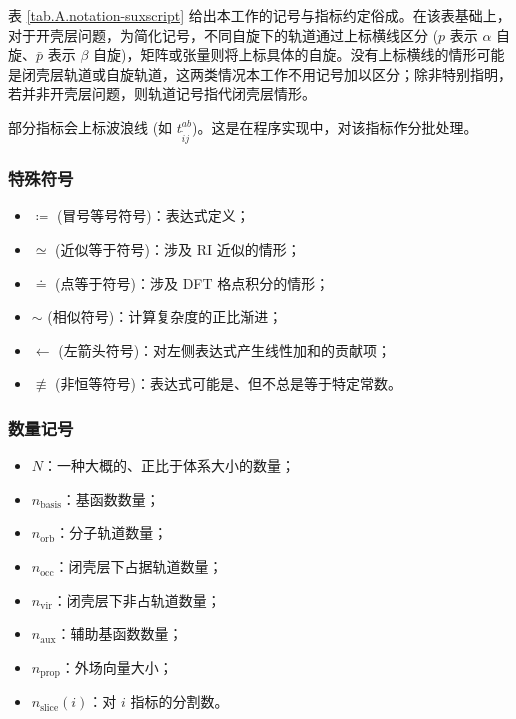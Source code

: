 表 \ref{tab.A.notation-suxscript} 给出本工作的记号与指标约定俗成。在该表基础上，对于开壳层问题，为简化记号，不同自旋下的轨道通过上标横线区分 ($p$ 表示 $\alpha$ 自旋、$\bar p$ 表示 $\beta$ 自旋)，矩阵或张量则将上标具体的自旋。没有上标横线的情形可能是闭壳层轨道或自旋轨道，这两类情况本工作不用记号加以区分；除非特别指明，若并非开壳层问题，则轨道记号指代闭壳层情形。

部分指标会上标波浪线 (如 $t_{\tilde{i} j}^{ab}$)。这是在程序实现中，对该指标作分批处理。

\subsubsection{特殊符号}

\begin{itemize}[nosep]
    \item $\coloneq$ (冒号等号符号)：表达式定义；
    \item $\simeq$ (近似等于符号)：涉及 RI 近似的情形；
    \item $\doteq$ (点等于符号)：涉及 DFT 格点积分的情形；
    \item $\sim$ (相似符号)：计算复杂度的正比渐进；
    \item $\leftarrow$ (左箭头符号)：对左侧表达式产生线性加和的贡献项；
    \item $\not \equiv$ (非恒等符号)：表达式可能是、但不总是等于特定常数。
\end{itemize}

\subsubsection{数量记号}

\begin{itemize}[nosep]
    \item $N$：一种大概的、正比于体系大小的数量；
    \item $n_\mathrm{basis}$：基函数数量；
    \item $n_\mathrm{orb}$：分子轨道数量；
    \item $n_\mathrm{occ}$：闭壳层下占据轨道数量；
    \item $n_\mathrm{vir}$：闭壳层下非占轨道数量；
    \item $n_\mathrm{aux}$：辅助基函数数量；
    \item $n_\mathrm{prop}$：外场向量大小；
    \item $n_\mathrm{slice}(i)$：对 $i$ 指标的分割数。
\end{itemize}

